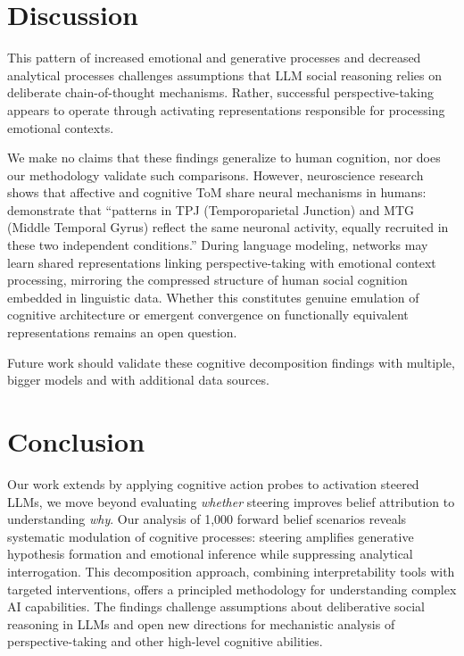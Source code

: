 \documentclass[letterpaper]{article}
\begin{document}
\section{Discussion}

This pattern of increased emotional and generative processes and decreased analytical processes challenges assumptions that LLM social reasoning relies on deliberate chain-of-thought mechanisms. Rather, successful perspective-taking appears to operate through activating representations responsible for processing emotional contexts.

We make no claims that these findings generalize to human cognition, nor does our methodology validate such comparisons. However, neuroscience research shows that affective and cognitive ToM share neural mechanisms in humans: \citet{Corradi2014} demonstrate that ``patterns in TPJ (Temporoparietal Junction) and MTG (Middle Temporal Gyrus) reflect the same neuronal activity, equally recruited in these two independent conditions.'' During language modeling, networks may learn shared representations linking perspective-taking with emotional context processing, mirroring the compressed structure of human social cognition embedded in linguistic data. Whether this constitutes genuine emulation of cognitive architecture or emergent convergence on functionally equivalent representations remains an open question.

Future work should validate these cognitive decomposition findings with multiple, bigger models and with additional data sources.

\section{Conclusion}

Our work extends \citet{Bortoletto2024} by applying cognitive action probes to activation steered LLMs, we move beyond evaluating \textit{whether} steering improves belief attribution to understanding \textit{why}. Our analysis of 1,000 forward belief scenarios reveals systematic modulation of cognitive processes: steering amplifies generative hypothesis formation and emotional inference while suppressing analytical interrogation. This decomposition approach, combining interpretability tools with targeted interventions, offers a principled methodology for understanding complex AI capabilities. The findings challenge assumptions about deliberative social reasoning in LLMs and open new directions for mechanistic analysis of perspective-taking and other high-level cognitive abilities.
\end{document}
